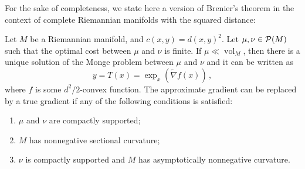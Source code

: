         For the sake of completeness, we state here a version of Brenier's theorem in the context of complete Riemannian manifolds with the squared distance:
        \begin{proposition}
            \label{prop:quad-cost-manifold-villani}
            Let $M$ be a Riemannian manifold, and $c(x, y)=d(x, y)^{2}$. Let $\mu, \nu\in\mathcal{P}(M)$ such that the optimal cost between $\mu$ and $\nu$ is finite. If $\mu\ll\operatorname{vol}_M$, then there is a unique solution of the Monge problem between $\mu$ and $\nu$ and it can be written as
            $$y=T(x)=\exp _{x}(\tilde{\nabla} f(x))\,,$$
            where $f$ is some $d^{2} / 2$-convex function. The approximate gradient can be replaced by a true gradient if any of the following conditions is satisfied:
            \begin{enumerate}[label=(\alph*)]
                \item $\mu$ and $\nu$ are compactly supported;
                \item $M$ has nonnegative sectional curvature\footnotemark;
                \item $\nu$ is compactly supported and $M$ has asymptotically nonnegative curvature.
            \end{enumerate}
        \end{proposition}

